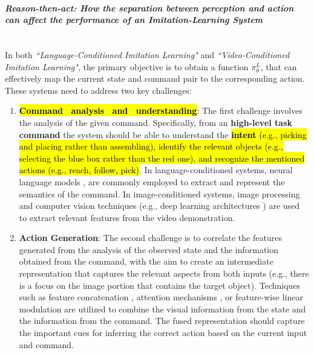 \paragraph{\textit{Reason-then-act: How the separation between perception and action can affect the performance of an Imitation-Learning System}} \mbox{} \\
In both \textit{``Language-Conditioned Imitation Learning"} and \textit{``Video-Conditioned Imitation Learning"}, the primary objective is to obtain a function $\pi_{\theta}^{L}$, that can effectively map the current state and command pair to the corresponding action. These systems need to address two key challenges:
\begin{enumerate}
    \item \hl{\textbf{Command \ analysis \ and \ understanding}}: The first challenge involves the
          analysis of the given command. Specifically, from an \textbf{high-level task command} the system should be able to understand the \hl{\textbf{intent} (e.g., picking and placing rather than assembling), identify the relevant objects (e.g., selecting the blue box rather than the red one), and recognize the mentioned actions (e.g., reach, follow, pick)}. In language-conditioned systems, neural language models \cite{stepputtis2020language,jang2022bc_z,brohan2022rt}, are commonly employed to extract and represent the semantics of the command. In image-conditioned systems, image processing and computer vision techniques (e.g., deep learning architectures \cite{dasari2021transformers_one_shot,mandi2022towards_more_generalizable_one_shot}) are used to extract relevant features from the video demonstration.
    \item \textbf{Action Generation}: The second challenge is to correlate the features generated from the analysis of the observed state and the information obtained from the command, with the aim to create an intermediate representation that captures the relevant aspects from both inputs (e.g., there is a focus on the image portion that contains the target object). Techniques such as feature concatenation \cite{james2018task_embedded,stepputtis2020language,bhutani2022attentive_one_shot}, attention mechanisms \cite{dasari2021transformers_one_shot,mandi2022towards_more_generalizable_one_shot}, or feature-wise linear modulation \cite{brohan2022rt} are utilized to combine the visual information from the state and the information from the command. The fused representation should capture the important cues for inferring the correct action based on the current input and command.
\end{enumerate}
